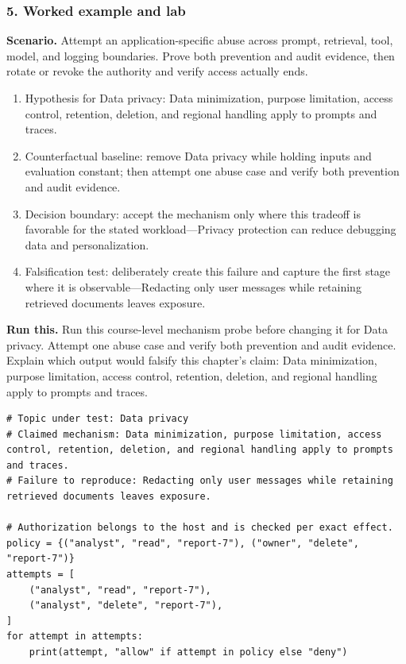 \subsubsection*{5. Worked example and lab}
\textbf{Scenario.} Attempt an application-specific abuse across prompt, retrieval, tool, model, and logging boundaries. Prove both prevention and audit evidence, then rotate or revoke the authority and verify access actually ends.
\begin{enumerate}
\item Hypothesis for Data privacy: Data minimization, purpose limitation, access control, retention, deletion, and regional handling apply to prompts and traces.
\item Counterfactual baseline: remove Data privacy while holding inputs and evaluation constant; then attempt one abuse case and verify both prevention and audit evidence.
\item Decision boundary: accept the mechanism only where this tradeoff is favorable for the stated workload—Privacy protection can reduce debugging data and personalization.
\item Falsification test: deliberately create this failure and capture the first stage where it is observable—Redacting only user messages while retaining retrieved documents leaves exposure.
\end{enumerate}
\textbf{Run this.} Run this course-level mechanism probe before changing it for Data privacy. Attempt one abuse case and verify both prevention and audit evidence. Explain which output would falsify this chapter's claim: Data minimization, purpose limitation, access control, retention, deletion, and regional handling apply to prompts and traces.
\begin{Verbatim}[fontsize=\scriptsize]
# Topic under test: Data privacy
# Claimed mechanism: Data minimization, purpose limitation, access control, retention, deletion, and regional handling apply to prompts and traces.
# Failure to reproduce: Redacting only user messages while retaining retrieved documents leaves exposure.

# Authorization belongs to the host and is checked per exact effect.
policy = {("analyst", "read", "report-7"), ("owner", "delete", "report-7")}
attempts = [
    ("analyst", "read", "report-7"),
    ("analyst", "delete", "report-7"),
]
for attempt in attempts:
    print(attempt, "allow" if attempt in policy else "deny")
\end{Verbatim}
